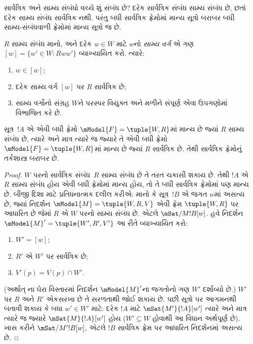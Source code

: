 સાર્વત્રિક અને સામ્ય સંબંધો વચ્ચે શું સંબંધ છે?
દરેક સાર્વત્રિક સંબંધ સામ્ય સંબંધ છે, છતાં દરેક
સામ્ય સંબંધ સાર્વત્રિક નથી. પરંતુ બધી સાર્વત્રિક
ફ્રેમોમાં માન્ય સૂત્રો બરાબર બધી સામ્ય-સંબંધવાળી
ફ્રેમોમાં માન્ય સૂત્રો જ છે.

\begin{prop}
  $R$ સામ્ય સંબંધ માનો, અને દરેક $w \in W$ માટે
  $w$નો \emph{સામ્ય વર્ગ} એ ગણ $[w] = \{w'\in W :
  Rww'\}$ વ્યાખ્યાયિત કરો. ત્યારે:
  \begin{enumerate}
  \item $w \in [w]$;
  \item દરેક સામ્ય વર્ગ $[w]$ પર $R$ સાર્વત્રિક છે;
  \item સામ્ય વર્ગોનો સંગ્રહ $W$ને પરસ્પર વિયુક્ત
    અને મળીને સંપૂર્ણ એવા ઉપગણોમાં વિભાજિત કરે છે.
  \end{enumerate}
\end{prop}

\begin{prop}
  સૂત્ર~$!A$ એ એવી બધી ફ્રેમો
  $\mModel{F} =\tuple{W,R}$માં માન્ય છે જ્યાં $R$
  સામ્ય સંબંધ છે, ત્યારે અને માત્ર ત્યારે જ જ્યારે
  તે એવી બધી ફ્રેમો $\mModel{F} =\tuple{W,R}$માં
  માન્ય છે જ્યાં $R$ સાર્વત્રિક છે. તેથી સાર્વત્રિક
  ફ્રેમોનું તર્કશાસ્ત્ર બરાબર  છે.
\end{prop}

\begin{proof}
  $W$ પરનો સાર્વત્રિક સંબંધ~$R$ સામ્ય સંબંધ છે
  તે તરત ચકાસી શકાય છે. તેથી $!A$ એ $R$ સામ્ય
  સંબંધ હોય એવી બધી ફ્રેમોમાં માન્ય હોય, તો તે
  બધી સાર્વત્રિક ફ્રેમોમાં પણ માન્ય છે. બીજી
  દિશા માટે પ્રતિધનાત્મક દલીલ કરીએ: માનો કે
  સૂત્ર~$!B$ એ જગત $w$માં અસત્ય છે,
  જ્યાં નિદર્શન $\mModel{M} = \tuple{W, R, V}$
  એવી ફ્રેમ $\tuple{W,R}$ પર આધારિત છે જેમાં $R$
  એ $W$ પરનો સામ્ય સંબંધ છે. એટલે
  $\mSat/{M}{!B}[w]$. હવે નિદર્શન
  $\mModel{M}' = \tuple{W',
    R', V'}$ આ રીતે વ્યાખ્યાયિત કરો:
  \begin{enumerate}
  \item $W' = [w]$;
  \item $R'$ એ $W'$ પર સાર્વત્રિક છે;
  \item $V'(p) = V(p) \cap W'$.
  \end{enumerate}
  (અર્થાત્ ના ઘેરા વિસ્તારમાં
  નિદર્શન $\mModel{M}'$ના જગતોનો ગણ $W'$
  દર્શાવ્યો છે.) $W'$ પર $R$ અને $R'$ એકસરખા
  છે તે સરળતાથી જોઈ શકાય છે. પછી સૂત્રો
  પર આગમનથી બતાવી શકાય કે બધા $w' \in W'$ માટે:
  દરેક $!A$ માટે $\mSat{M'}{!A}[w']$ ત્યારે અને
  માત્ર ત્યારે જ જ્યારે $\mSat{M}{!A}[w']$ હોય
  ($W'
  \subseteq W$ હોવાથી આ વિધાન અર્થપૂર્ણ છે).
  ખાસ કરીને $\mSat/{M'}{!B}[w]$, એટલે $!B$
  સાર્વત્રિક ફ્રેમ પર આધારિત નિદર્શનમાં અસત્ય છે.
\end{proof}

